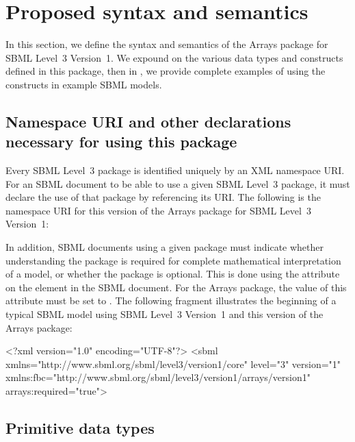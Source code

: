 
\section{Proposed syntax and semantics}
\label{syntax}

In this section, we define the syntax and semantics of the Arrays package for SBML Level~3 Version~1.  We expound on the various data types and constructs defined in this package, then in , we provide complete examples of using the constructs in example SBML models.

\subsection{Namespace URI and other declarations necessary for using this package}
\label{xml-namespace}

Every SBML Level~3 package is identified uniquely by an XML namespace URI.
For an SBML document to be able to use a given SBML Level~3 package, it
must declare the use of that package by referencing its URI.  The following
is the namespace URI for this version of the Arrays
package for SBML Level~3 Version~1:
\begin{center}
\end{center}

In addition, SBML documents using a given package must indicate whether
understanding the package is required for complete mathematical
interpretation of a model, or whether the package is optional.  This is
done using the attribute  on the  element in
the SBML document.  For the Arrays package, the value of
this attribute must be set to .
The following fragment illustrates the beginning of a typical SBML model
using SBML Level~3 Version~1 and this version of the Arrays package:

\begin{example}
<?xml version="1.0" encoding="UTF-8"?>
<sbml xmlns="http://www.sbml.org/sbml/level3/version1/core" level="3" version="1"
      xmlns:fbc="http://www.sbml.org/sbml/level3/version1/arrays/version1" arrays:required="true">
\end{example}

\subsection{Primitive data types}

